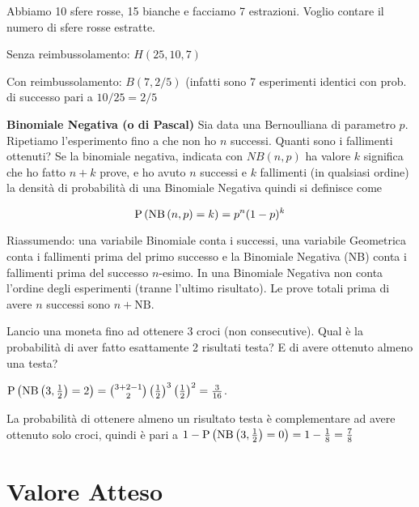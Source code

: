 \begin{exmp}
    Abbiamo 10 sfere rosse, 15 bianche e facciamo 7 estrazioni. Voglio contare il numero di sfere rosse estratte.

    Senza reimbussolamento: $H(25,10,7)$
    
    Con reimbussolamento: $B(7,2/5)$ (infatti sono 7 esperimenti identici con prob. di successo pari a
    $10/25=2/5$
\end{exmp}

\begin{defn}
    \textbf{Binomiale Negativa (o di Pascal)}
    Sia data una Bernoulliana di parametro $ p $. Ripetiamo l'esperimento fino a che non ho $ n $ successi. Quanti sono i fallimenti ottenuti?
	Se la binomiale negativa, indicata con $NB(n,p)$  ha valore $k$ significa che ho fatto $n+k$ prove,
	e ho avuto $ n $ successi e $ k $ fallimenti (in qualsiasi ordine)  la densit\`a di probabilit\`a  di una Binomiale Negativa quindi si definisce come

    \begin{equation*}
    \text{P}\left(\text{NB}\left(n, p\right) = k\right) = p^n(1-p)^k
    \end{equation*}
\end{defn}

Riassumendo: una variabile Binomiale conta i successi, una variabile Geometrica conta i fallimenti prima del primo successo e la Binomiale Negativa (NB) conta i fallimenti prima del successo $ n $-esimo. In una Binomiale Negativa non conta l'ordine degli esperimenti (tranne l'ultimo risultato). Le prove totali prima di avere $ n $ successi sono $ n+\text{NB} $.

\begin{exmp}
	Lancio una moneta fino ad ottenere 3 croci (non consecutive). Qual \`e la probabilit\`a  di aver fatto esattamente 2 risultati testa? E di avere ottenuto almeno una testa?

    $ \text{P}\left(\text{NB}\left(3, \frac{1}{2}\right) = 2\right) = \binom{3+2-1}{2} \left(\frac{1}{2}\right)^3 \left(\frac{1}{2}\right)^2 = \frac{3}{16} $.

	La probabilit\`a  di ottenere almeno un risultato testa \`e complementare ad avere ottenuto solo croci, quindi \`e pari a $1- \text{P}\left(\text{NB}\left(3, \frac{1}{2}\right) = 0\right) = 1 - \frac{1}{8} = \frac{7}{8} $
\end{exmp}

\section{Valore Atteso}

